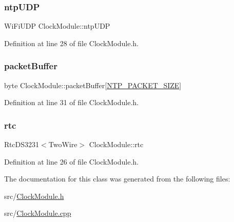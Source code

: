\subsubsection{\texorpdfstring{ntpUDP}{ntpUDP}}
{\footnotesize\ttfamily Wi\+Fi\+U\+DP Clock\+Module\+::ntp\+U\+DP\hspace{0.3cm}{\ttfamily [private]}}



Definition at line 28 of file Clock\+Module.\+h.

\mbox{\label{class_clock_module_a51e755c2014a01ab68c58c1bcbea5184}} 
\subsubsection{\texorpdfstring{packetBuffer}{packetBuffer}}
{\footnotesize\ttfamily byte Clock\+Module\+::packet\+Buffer\mbox{[}\mbox{\hyperlink{class_clock_module_ab12ec0e0e1a0a02861feae0272840cff}{N\+T\+P\+\_\+\+P\+A\+C\+K\+E\+T\+\_\+\+S\+I\+ZE}}\mbox{]}\hspace{0.3cm}{\ttfamily [private]}}



Definition at line 31 of file Clock\+Module.\+h.

\mbox{\label{class_clock_module_a191d985f5169622e48f7babba844bd60}} 
\subsubsection{\texorpdfstring{rtc}{rtc}}
{\footnotesize\ttfamily Rtc\+D\+S3231$<$Two\+Wire$>$ Clock\+Module\+::rtc\hspace{0.3cm}{\ttfamily [private]}}



Definition at line 26 of file Clock\+Module.\+h.



The documentation for this class was generated from the following files\+:\begin{DoxyCompactItemize}
\item 
src/\mbox{\hyperlink{_clock_module_8h}{Clock\+Module.\+h}}\item 
src/\mbox{\hyperlink{_clock_module_8cpp}{Clock\+Module.\+cpp}}\end{DoxyCompactItemize}
